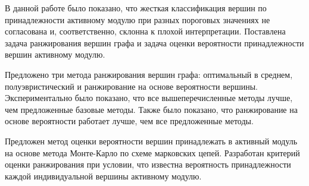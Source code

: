 \startconclusionpage

В данной работе было показано, что жесткая классификация вершин по
принадлежности активному модулю при разных пороговых значениях не согласована
и, соответственно, склонна к плохой интерпретации.  Поставлена задача
ранжирования вершин графа и задача оценки вероятности принадлежности вершин
активному модулю.

Предложено три метода ранжирования вершин графа: оптимальный в среднем,
полуэвристический и ранжирование на основе вероятности вершины.
Экспериментально было показано, что все вышеперечисленные методы лучше, чем
предложенные базовые методы. Также было показано, что ранжирование на основе
вероятности работает лучше, чем все предложенные методы.

Предложен метод оценки вероятности вершин принадлежать в активный модуль на
основе метода Монте-Карло по схеме марковских цепей.  Разработан критерий
оценки ранжирования при условии, что известна вероятность принадлежности каждой
индивидуальной вершины активному модулю.
